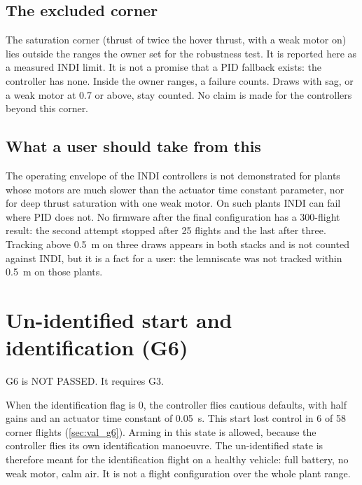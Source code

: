
\subsection{The excluded corner}

The saturation corner (thrust of twice the hover thrust, with a weak motor on) lies outside the ranges the owner set for the robustness test.
It is reported here as a measured INDI limit.
It is not a promise that a PID fallback exists: the controller has none.
Inside the owner ranges, a failure counts.
Draws with sag, or a weak motor at 0.7 or above, stay counted.
No claim is made for the controllers beyond this corner.

\subsection{What a user should take from this}

The operating envelope of the INDI controllers is not demonstrated for plants whose motors are much slower than the actuator time constant parameter, nor for deep thrust saturation with one weak motor.
On such plants INDI can fail where PID does not.
No firmware after the final configuration has a 300-flight result: the second attempt stopped after 25 flights and the last after three.
Tracking above 0.5~m on three draws appears in both stacks and is not counted against INDI, but it is a fact for a user: the lemniscate was not tracked within 0.5~m on those plants.

\section{Un-identified start and identification (G6)}\label{sec:lim_g6}

G6 is NOT PASSED.
It requires G3.

When the identification flag  is 0, the controller flies cautious defaults, with half gains and an actuator time constant of 0.05~s.
This start lost control in 6 of 58 corner flights (\cref{sec:val_g6}).
Arming in this state is allowed, because the controller flies its own identification manoeuvre.
The un-identified state is therefore meant for the identification flight on a healthy vehicle: full battery, no weak motor, calm air.
It is not a flight configuration over the whole plant range.

